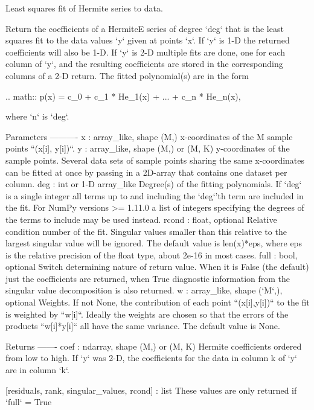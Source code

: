 \begin{DoxyVerb}Least squares fit of Hermite series to data.

Return the coefficients of a HermiteE series of degree `deg` that is
the least squares fit to the data values `y` given at points `x`. If
`y` is 1-D the returned coefficients will also be 1-D. If `y` is 2-D
multiple fits are done, one for each column of `y`, and the resulting
coefficients are stored in the corresponding columns of a 2-D return.
The fitted polynomial(s) are in the form

.. math::  p(x) = c_0 + c_1 * He_1(x) + ... + c_n * He_n(x),

where `n` is `deg`.

Parameters
----------
x : array_like, shape (M,)
    x-coordinates of the M sample points ``(x[i], y[i])``.
y : array_like, shape (M,) or (M, K)
    y-coordinates of the sample points. Several data sets of sample
    points sharing the same x-coordinates can be fitted at once by
    passing in a 2D-array that contains one dataset per column.
deg : int or 1-D array_like
    Degree(s) of the fitting polynomials. If `deg` is a single integer
    all terms up to and including the `deg`'th term are included in the
    fit. For NumPy versions >= 1.11.0 a list of integers specifying the
    degrees of the terms to include may be used instead.
rcond : float, optional
    Relative condition number of the fit. Singular values smaller than
    this relative to the largest singular value will be ignored. The
    default value is len(x)*eps, where eps is the relative precision of
    the float type, about 2e-16 in most cases.
full : bool, optional
    Switch determining nature of return value. When it is False (the
    default) just the coefficients are returned, when True diagnostic
    information from the singular value decomposition is also returned.
w : array_like, shape (`M`,), optional
    Weights. If not None, the contribution of each point
    ``(x[i],y[i])`` to the fit is weighted by ``w[i]``. Ideally the
    weights are chosen so that the errors of the products ``w[i]*y[i]``
    all have the same variance.  The default value is None.

Returns
-------
coef : ndarray, shape (M,) or (M, K)
    Hermite coefficients ordered from low to high. If `y` was 2-D,
    the coefficients for the data in column k  of `y` are in column
    `k`.

[residuals, rank, singular_values, rcond] : list
    These values are only returned if `full` = True


\end{DoxyVerb}
